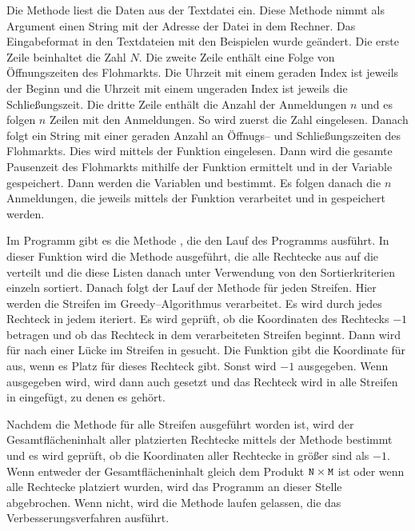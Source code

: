 Die Methode  liest die Daten aus der Textdatei ein.
Diese Methode nimmt als Argument einen String mit der Adresse der Datei in dem Rechner.
Das Eingabeformat in den Textdateien mit den Beispielen wurde geändert.
Die erste Zeile beinhaltet die Zahl $N$. Die zweite Zeile enthält
eine Folge von Öffnungszeiten des Flohmarkts. Die Uhrzeit mit einem geraden Index ist jeweils der
Beginn und die Uhrzeit mit einem ungeraden Index ist jeweils die Schließungszeit.
Die dritte Zeile enthält die Anzahl der Anmeldungen $n$ und es folgen $n$ Zeilen mit den Anmeldungen.
So wird zuerst die Zahl  eingelesen. 
Danach folgt ein String mit einer geraden Anzahl an Öffnugs-- und Schließungszeiten des Flohmarkts.
Dies wird mittels der Funktion  eingelesen.
Dann wird die gesamte Pausenzeit des Flohmarkts mithilfe der Funktion  ermittelt
und in der Variable  gespeichert. 
Dann werden die Variablen  und  bestimmt.
Es folgen danach die $n$ Anmeldungen,
die jeweils mittels der Funktion  verarbeitet und
in  gespeichert werden.

Im Programm gibt es die Methode , die den Lauf des Programms ausführt.
In dieser Funktion wird die Methode  ausgeführt, die alle
Rechtecke aus  auf die 
 verteilt und die diese Listen danach unter Verwendung
von den Sortierkriterien  einzeln sortiert.
Danach folgt der Lauf der Methode  für jeden Streifen.
Hier werden die Streifen im Greedy--Algorithmus verarbeitet.
Es wird durch jedes Rechteck  in jedem   iteriert.
Es wird geprüft, ob die Koordinaten des Rechtecks  $-1$ betragen und ob das Rechteck
in dem verarbeiteten Streifen beginnt.
Dann wird für  nach einer Lücke im Streifen in  gesucht.
Die Funktion  gibt die Koordinate  für  aus,
wenn es Platz für dieses Rechteck gibt. Sonst wird $-1$ ausgegeben.
Wenn  ausgegeben wird, wird dann auch  gesetzt und 
das Rechteck  wird in alle Streifen in  eingefügt, 
zu denen es gehört.

Nachdem die Methode  für alle Streifen ausgeführt worden ist,
wird der Gesamtflächeninhalt aller platzierten Rechtecke mittels der Methode 
 bestimmt und es wird geprüft, ob 
die Koordinaten aller Rechtecke in  größer sind als $-1$.
Wenn entweder der Gesamtflächeninhalt gleich dem Produkt $\texttt{N} \times \texttt{M}$ ist
oder wenn alle Rechtecke platziert wurden, wird das Programm an dieser Stelle abgebrochen.
Wenn nicht, wird die Methode  laufen gelassen, die
das Verbesserungsverfahren ausführt.


